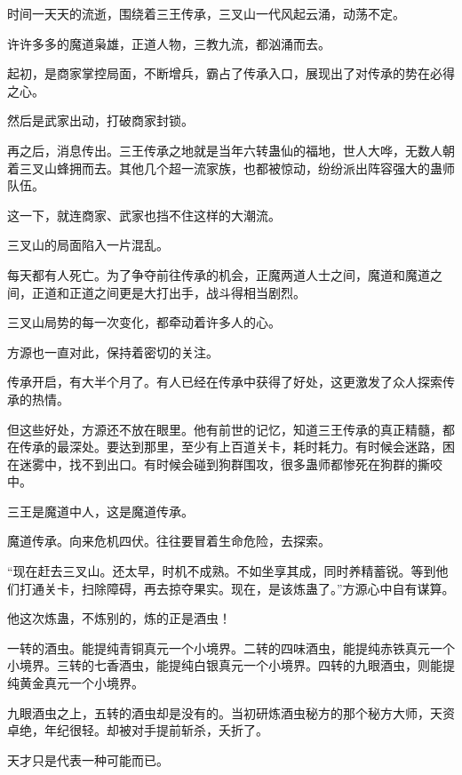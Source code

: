 
\begin{this_body}



时间一天天的流逝，围绕着三王传承，三叉山一代风起云涌，动荡不定。

许许多多的魔道枭雄，正道人物，三教九流，都汹涌而去。

起初，是商家掌控局面，不断增兵，霸占了传承入口，展现出了对传承的势在必得之心。

然后是武家出动，打破商家封锁。

再之后，消息传出。三王传承之地就是当年六转蛊仙的福地，世人大哗，无数人朝着三叉山蜂拥而去。其他几个超一流家族，也都被惊动，纷纷派出阵容强大的蛊师队伍。

这一下，就连商家、武家也挡不住这样的大潮流。

三叉山的局面陷入一片混乱。

每天都有人死亡。为了争夺前往传承的机会，正魔两道人士之间，魔道和魔道之间，正道和正道之间更是大打出手，战斗得相当剧烈。

三叉山局势的每一次变化，都牵动着许多人的心。

方源也一直对此，保持着密切的关注。

传承开启，有大半个月了。有人已经在传承中获得了好处，这更激发了众人探索传承的热情。

但这些好处，方源还不放在眼里。他有前世的记忆，知道三王传承的真正精髓，都在传承的最深处。要达到那里，至少有上百道关卡，耗时耗力。有时候会迷路，困在迷雾中，找不到出口。有时候会碰到狗群围攻，很多蛊师都惨死在狗群的撕咬中。

三王是魔道中人，这是魔道传承。

魔道传承。向来危机四伏。往往要冒着生命危险，去探索。

“现在赶去三叉山。还太早，时机不成熟。不如坐享其成，同时养精蓄锐。等到他们打通关卡，扫除障碍，再去掠夺果实。现在，是该炼蛊了。”方源心中自有谋算。

他这次炼蛊，不炼别的，炼的正是酒虫！

一转的酒虫。能提纯青铜真元一个小境界。二转的四味酒虫，能提纯赤铁真元一个小境界。三转的七香酒虫，能提纯白银真元一个小境界。四转的九眼酒虫，则能提纯黄金真元一个小境界。

九眼酒虫之上，五转的酒虫却是没有的。当初研炼酒虫秘方的那个秘方大师，天资卓绝，年纪很轻。却被对手提前斩杀，夭折了。

天才只是代表一种可能而已。


\end{this_body}
